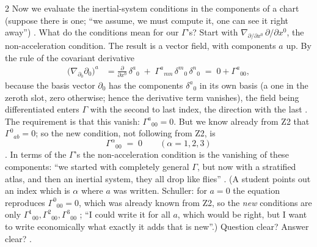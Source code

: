 \begin{paracol}{2}
Now we evaluate the inertial-system conditions in the components of a chart (suppose there is one; ``we assume, we must compute it, one can see it right away'') .
What do the conditions mean for our $\Gamma$'s? Start with $\nabla_{\partial/\partial x^0}\,\partial/\partial x^0$, the non-acceleration condition. The result is a vector field, with components $a$ up. By the rule of the covariant derivative
\begin{align*}
  \bigl(\nabla_{\partial_0}\partial_0\bigr)^a
  &=\frac{\partial}{\partial x^0}\,\delta^a{}_0\;+\;\Gamma^a{}_{mn}\,\delta^m{}_0\,\delta^n{}_0
  \;=\;0+\Gamma^a{}_{00},
\end{align*}
because the basis vector $\partial_0$ has the components $\delta^a{}_0$ in its own basis (a one in the zeroth slot, zero otherwise; hence the derivative term vanishes), the field being differentiated enters $\Gamma$ with the second to last
index, the direction with the last . The requirement is that this vanish: $\Gamma^a{}_{00}=0$. But we know already from Z2 that $\Gamma^0{}_{ab}=0$; so the new condition, not following from Z2,
is
\begin{equation}\label{eq:nk-noaccel}
  \Gamma^\alpha{}_{00}\;=\;0\qquad(\alpha=1,2,3)
\end{equation}
. In terms of the $\Gamma$'s the non-acceleration condition is the vanishing of these components: ``we started with completely general $\Gamma$, but now with a stratified atlas, and then an inertial system, they all drop like flies'' .
(A student points out an index which is $\alpha$ where $a$ was written. Schuller: for $a=0$ the equation reproduces $\Gamma^0{}_{00}=0$, which was already known from Z2, so the \emph{new} conditions are only $\Gamma^1{}_{00},\Gamma^2{}_{00},\Gamma^3{}_{00}$ ;
``I could write it for all $a$, which would be right, but I want to write economically what exactly it adds that is new''.) Question clear? Answer clear? .


\end{paracol}
